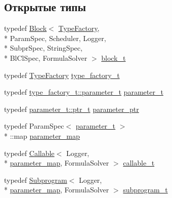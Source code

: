 \subsection*{Открытые типы}
\begin{DoxyCompactItemize}
\item 
typedef \hyperlink{classLIBKMS__namespace_1_1Block}{Block}$<$ \hyperlink{classLIBKMS__namespace_1_1TypeFactory}{Type\-Factory}, \\*
Param\-Spec, Scheduler, Logger, \\*
Subpr\-Spec, String\-Spec, \\*
Bl\-Cl\-Spec, Formula\-Solver $>$ \hyperlink{classLIBKMS__namespace_1_1Block_ae33d301121e149f8c7cc9a19f7046237}{block\-\_\-t}
\item 
typedef \hyperlink{classLIBKMS__namespace_1_1TypeFactory}{Type\-Factory} \hyperlink{classLIBKMS__namespace_1_1Block_a1eac0ca1a7f0b6eb9e18a2990d3aa286}{type\-\_\-factory\-\_\-t}
\item 
typedef \hyperlink{classLIBKMS__namespace_1_1TypeFactory_a103a08b747cfe5b233b12c802b4563dc}{type\-\_\-factory\-\_\-t\-::parameter\-\_\-t} \hyperlink{classLIBKMS__namespace_1_1Block_aebb850556ee5e8369c1d95caa5dc9c69}{parameter\-\_\-t}
\item 
typedef \hyperlink{classLIBKMS__namespace_1_1Parameter_a28516bcd5bad5857b2d1c676e4176f51}{parameter\-\_\-t\-::ptr\-\_\-t} \hyperlink{classLIBKMS__namespace_1_1Block_ac67e65c4f0bd77566768ec64e25382b6}{parameter\-\_\-ptr}
\item 
typedef Param\-Spec$<$ \hyperlink{classLIBKMS__namespace_1_1Block_aebb850556ee5e8369c1d95caa5dc9c69}{parameter\-\_\-t} $>$\\*
\-::map \hyperlink{classLIBKMS__namespace_1_1Block_a8d67012b101494c21dee73cd82a1e99f}{parameter\-\_\-map}
\item 
typedef \hyperlink{classLIBKMS__namespace_1_1Callable}{Callable}$<$ Logger, \\*
\hyperlink{classLIBKMS__namespace_1_1Block_a8d67012b101494c21dee73cd82a1e99f}{parameter\-\_\-map}, Formula\-Solver $>$ \hyperlink{classLIBKMS__namespace_1_1Block_a3742cf8820e4b909e4fbcc3d9c22d686}{callable\-\_\-t}
\item 
typedef \hyperlink{classLIBKMS__namespace_1_1Subprogram}{Subprogram}$<$ Logger, \\*
\hyperlink{classLIBKMS__namespace_1_1Block_a8d67012b101494c21dee73cd82a1e99f}{parameter\-\_\-map}, Formula\-Solver $>$ \hyperlink{classLIBKMS__namespace_1_1Block_a89ead8d5558038ca06b862f1988c3d1a}{subprogram\-\_\-t}

\end{DoxyCompactItemize}

